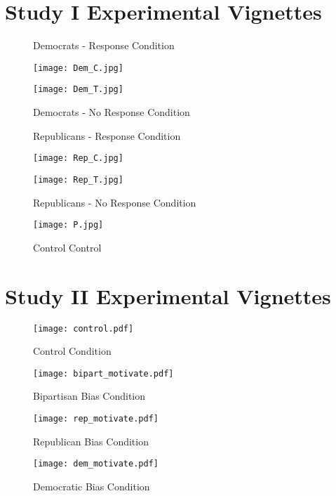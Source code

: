 \documentclass[12pt, letterpaper]{article}
\begin{document}
\section{Study I Experimental Vignettes}

\begin{figure}[ht]
\centering
\begin{minipage}[b][12cm][b]{0.45\linewidth}
\caption{Democrats - Response Condition}
\texttt{[image: Dem\_C.jpg]}
\label{fig:minipage1}
\end{minipage}
\quad
\begin{minipage}[b]{0.45\linewidth}
\caption{Democrats - No Response Condition}
\texttt{[image: Dem\_T.jpg]}
\label{fig:minipage2}
\end{minipage}
\end{figure}

\begin{figure}[ht]
\centering
\begin{minipage}[b][12cm][b]{0.45\linewidth}
\caption{Republicans - Response Condition}
\texttt{[image: Rep\_C.jpg]}
\label{fig:minipage3}
\end{minipage}
\quad
\begin{minipage}[b]{0.45\linewidth}
\caption{Republicans - No Response Condition}
\texttt{[image: Rep\_T.jpg]}
\label{fig:minipage4}
\end{minipage}
\end{figure}

\begin{figure}[ht]
\centering
\begin{minipage}[b][12cm][b]{0.45\linewidth}
\caption{Control Control}
\texttt{[image: P.jpg]}
\label{fig:minipage5}
\end{minipage}
\end{figure}
\clearpage

\section{Study II Experimental Vignettes}

\begin{figure}[H]
\centering
{}
\caption{Control Condition}
\texttt{[image: control.pdf]}
\smallskip
\end{figure}

\begin{figure}[H]
\centering
{}
\caption{Bipartisan Bias Condition}
\texttt{[image: bipart\_motivate.pdf]}
\smallskip
\end{figure}


\begin{figure}[H]
\centering
{}
\caption{Republican Bias Condition}
\texttt{[image: rep\_motivate.pdf]}
\smallskip
\end{figure}

\begin{figure}[H]
\centering
{}
\caption{Democratic Bias Condition}
\texttt{[image: dem\_motivate.pdf]}
\smallskip
\end{figure}
\end{document}
